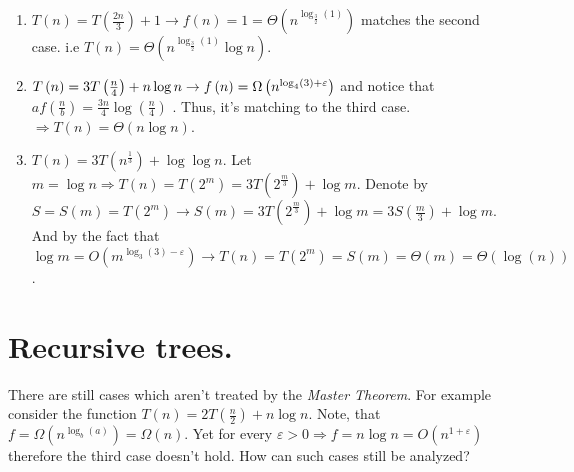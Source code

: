 \begin{example} 
\begin{enumerate}
    \item \( T\left(n\right) =  T\left(\frac{2n}{3}\right) + 1 \rightarrow f\left(n\right) = 1 =\Theta \left( n^{\log_{\frac{3}{2}} \left(1\right)}\right)\) matches the second case. i.e  \( T\left(n\right) = \Theta \left( n^{\log_{\frac{3}{2}} \left(1\right)}\log n \right)\).
    
    \item \( T\left(n\right) = 3 T\left(\frac{n}{4}\right) + n\log n \rightarrow f\left(n\right) = \Omega\left( n^{\log_{4}\left(3\right) + \varepsilon}  \right) \) and notice that \( af\left( \frac{n}{b}\right) = \frac{3n}{4}\log\left(\frac{n}{4}\right)\) . Thus, it's matching to the third case. \(\Rightarrow T\left(n\right) = \Theta\left(n\log n\right)\).
    
    \item \(T\left(n\right) = 3T\left( n^{\frac{1}{3}}\right) + \log\log n\). Let \( m = \log n \Rightarrow T\left( n\right) = T \left(2^m \right) = 3T\left(2^{\frac{m}{3}} \right) + \log m\).  Denote by \(S = S\left(m\right) = T\left(2^m\right) \rightarrow S\left(m\right) = 3T\left(2^{\frac{m}{3}} \right) + \log m = 3S\left(\frac{m}{3} \right) + \log m\). And by the fact that \(\log m = O\left(m^{\log_{3}\left(3\right)-\varepsilon} \right) \rightarrow T\left(n\right) = T\left(2^m\right) = S\left(m\right) = \Theta\left(m\right) = \Theta\left( \log(n)\right) \).  
\end{enumerate}
\end{example}

\section{Recursive trees.}
There are still cases which aren't treated by the \textit{Master Theorem}. For example consider the function \(T\left(n\right) = 2T\left(\frac{n}{2}\right) + n\log n \). Note, that \(f = \Omega\left( n^{\log_{b}(a)} \right) = \Omega\left(n\right)\). Yet for every \( \varepsilon > 0 \Rightarrow f = n\log n = O\left( n^{1+\varepsilon} \right) \) therefore the third case  doesn't hold. How can such cases still be analyzed? 

